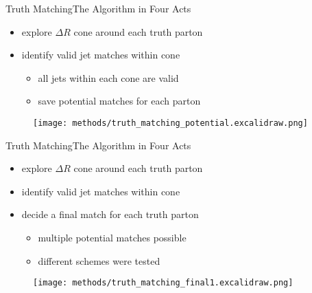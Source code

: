\documentclass[9pt, aspectratio=169]{beamer}
\begin{document}
\addtocounter{framenumber}{-1} 

\begin{frame}{Truth Matching}{The Algorithm in Four Acts}
	\begin{minipage}{.60\textwidth}
		\begin{itemize}
			\item explore $\Delta R$ cone around each truth parton 
			\item identify valid jet matches within cone
			\begin{itemize}
				\item all jets within each cone are valid
				\item save potential matches for each parton
			\end{itemize}
		\end{itemize}
	\end{minipage}\hfill
	\begin{minipage}{.38\textwidth}
		\begin{figure}
			\centering
			\texttt{[image: methods/truth\_matching\_potential.excalidraw.png]}
		\end{figure}
	\end{minipage}
\end{frame}

\addtocounter{framenumber}{-1} 

\begin{frame}{Truth Matching}{The Algorithm in Four Acts}
	\begin{minipage}{.60\textwidth}
		\begin{itemize}
			\item explore $\Delta R$ cone around each truth parton 
			\item identify valid jet matches within cone
			\item decide a final match for each truth parton 
			\begin{itemize}
				\item multiple potential matches possible
				\item different schemes were tested
			\end{itemize}
		\end{itemize}
	\end{minipage}\hfill
	\begin{minipage}{.38\textwidth}
		\begin{figure}
			\centering
			\texttt{[image: methods/truth\_matching\_final1.excalidraw.png]}
		\end{figure}
	\end{minipage}
\end{frame}
\end{document}

